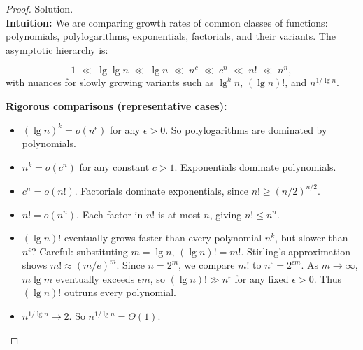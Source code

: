 \documentclass[12pt]{article}
\theoremstyle{definition}
\begin{document}
\begin{proof}
Solution. \\

\noindent
\textbf{Intuition:}  
We are comparing growth rates of common classes of functions: polynomials, polylogarithms, exponentials, factorials, and their variants.  
The asymptotic hierarchy is:

\[
1 \;\ll\; \lg\lg n \;\ll\; \lg n \;\ll\; n^c \;\ll\; c^n \;\ll\; n! \;\ll\; n^n,
\]
with nuances for slowly growing variants such as $\lg^k n$, $(\lg n)!$, and $n^{1/\lg n}$.

\noindent
\textbf{Rigorous comparisons (representative cases):}
\begin{itemize}
\item $(\lg n)^k = o(n^\epsilon)$ for any $\epsilon>0$. So polylogarithms are dominated by polynomials.
\item $n^k = o(c^n)$ for any constant $c>1$. Exponentials dominate polynomials.
\item $c^n = o(n!)$. Factorials dominate exponentials, since $n! \ge (n/2)^{n/2}$.
\item $n! = o(n^n)$. Each factor in $n!$ is at most $n$, giving $n!\le n^n$.
\item $(\lg n)!$ eventually grows faster than every polynomial $n^k$, but slower than $n^\epsilon$?  
Careful: substituting $m=\lg n$, $(\lg n)! = m!$. Stirling’s approximation shows $m! \approx (m/e)^m$. Since $n=2^m$, we compare $m!$ to $n^\epsilon = 2^{\epsilon m}$. As $m\to\infty$, $m\lg m$ eventually exceeds $\epsilon m$, so $(\lg n)! \gg n^\epsilon$ for any fixed $\epsilon>0$. Thus $(\lg n)!$ outruns every polynomial.
\item $n^{1/\lg n} \to 2$. So $n^{1/\lg n}=\Theta(1)$.
\end{itemize}


\end{proof}
\end{document}
